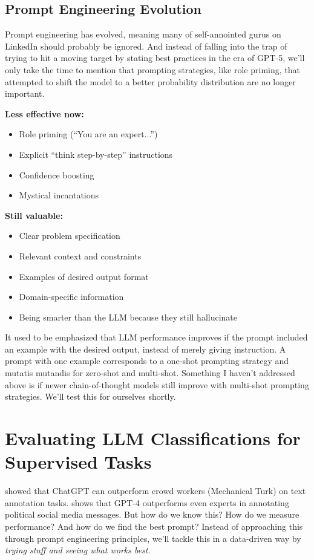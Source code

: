 \subsection{Prompt Engineering Evolution}

Prompt engineering has evolved, meaning many of self-annointed gurus on LinkedIn should probably be ignored. And instead of falling into the trap of trying to hit a moving target by stating best practices in the era of GPT-5, we'll only take the time to mention that prompting strategies, like role priming, that attempted to shift the model to a better probability distribution are no longer important.

\textbf{Less effective now:}
\begin{itemize}
\item Role priming (``You are an expert...'')
\item Explicit ``think step-by-step'' instructions
\item Confidence boosting
\item Mystical incantations
\end{itemize}

\textbf{Still valuable:}
\begin{itemize}
\item Clear problem specification
\item Relevant context and constraints
\item Examples of desired output format
\item Domain-specific information
\item Being smarter than the LLM because they still hallucinate
\end{itemize}

It used to be emphasized that LLM performance improves if the prompt included an example with the desired output, instead of merely giving instruction. A prompt with one example corresponds to a one-shot prompting strategy and mutatis mutandis for zero-shot and multi-shot. Something I haven't addressed above is if newer chain-of-thought models still improve with multi-shot prompting strategies. We'll test this for ourselves shortly.

\section{Evaluating LLM Classifications for Supervised Tasks}

\cite{gilardi2023chatgpt} showed that ChatGPT can outperform crowd workers (Mechanical Turk) on text annotation tasks. \cite{tornberg2024large} shows that GPT-4 outperforms even experts in annotating political social media messages. But how do we know this? How do we measure performance? And how do we find the best prompt? Instead of approaching this through prompt engineering principles, we'll tackle this in a data-driven way by \textit{trying stuff and seeing what works best}.

